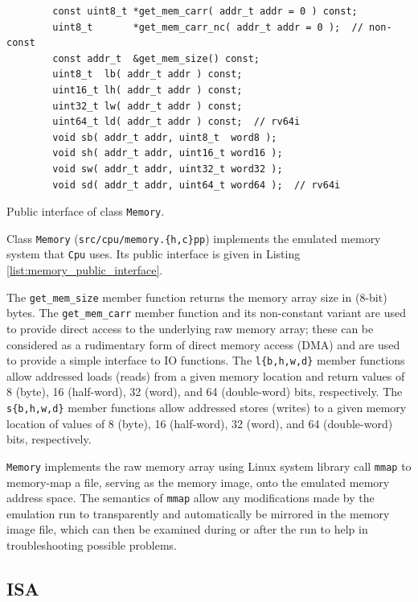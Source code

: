 \documentclass[a4paper]{amsart}
\begin{document}
\begin{listing}
    \begin{verbatim}
        const uint8_t *get_mem_carr( addr_t addr = 0 ) const;
        uint8_t       *get_mem_carr_nc( addr_t addr = 0 );  // non-const
        const addr_t  &get_mem_size() const;
        uint8_t  lb( addr_t addr ) const;
        uint16_t lh( addr_t addr ) const;
        uint32_t lw( addr_t addr ) const;
        uint64_t ld( addr_t addr ) const;  // rv64i
        void sb( addr_t addr, uint8_t  word8 );
        void sh( addr_t addr, uint16_t word16 );
        void sw( addr_t addr, uint32_t word32 );
        void sd( addr_t addr, uint64_t word64 );  // rv64i
    \end{verbatim}
    \caption{Public interface of class \texttt{Memory}.}
    \label{list:memory_public_interface}
\end{listing}

\noindent
Class \texttt{Memory} (\texttt{src/cpu/memory.\{h,c\}pp}) implements the emulated memory system that \texttt{Cpu} uses.
Its public interface is given in Listing \ref{list:memory_public_interface}.

The \texttt{get\_mem\_size} member function returns the memory array size in (8-bit) bytes.
The \texttt{get\_mem\_carr} member function and its non-constant variant are used to provide direct access to the underlying raw memory array; these can be considered as a rudimentary form of direct memory access (DMA) and are used to provide a simple interface to IO functions.
The \texttt{l\{b,h,w,d\}} member functions allow addressed loads (reads) from a given memory location and return values of 8 (byte), 16 (half-word), 32 (word), and 64 (double-word) bits, respectively.
The \texttt{s\{b,h,w,d\}} member functions allow addressed stores (writes) to a given memory location of values of 8 (byte), 16 (half-word), 32 (word), and 64 (double-word) bits, respectively.

\texttt{Memory} implements the raw memory array using Linux system library call \texttt{mmap} to memory-map a file, serving as the memory image, onto the emulated memory address space.
The semantics of \texttt{mmap} allow any modifications made by the emulation run to transparently and automatically be mirrored in the memory image file, which can then be examined during or after the run to help in troubleshooting possible problems.


\medbreak
\subsection{ISA}
\end{document}
